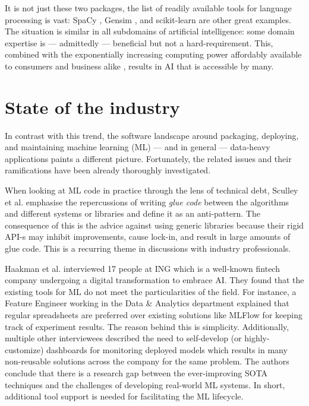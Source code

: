 It is not just these two packages, the list of readily available tools for language processing is vast: SpaCy \cite{srinivasa2018natural}, Gensim \cite{vrehuuvrek2011gensim}, and scikit-learn \cite{pedregosa2011scikit} are other great examples. The situation is similar in all subdomains of artificial intelligence: some domain expertise is --- admittedly --- beneficial but not a hard-requirement. This, combined with the exponentially increasing computing power affordably available to consumers and business alike \cite{sun2019summarizing}, results in AI that is accessible by many.

\section{State of the industry} \label{section:industry}

In contrast with this trend, the software landscape around packaging, deploying, and maintaining machine learning (ML) --- and in general --- data-heavy applications paints a different picture. Fortunately, the related issues and their ramifications have been already thoroughly investigated.

When looking at ML code in practice through the lens of technical debt, Sculley et al. \cite{sculley2015hidden} emphasise the repercussions of writing \textit{glue code} between the algorithms and different systems or libraries and define it as an anti-pattern. The consequence of this is the advice against using generic libraries because their rigid API-s may inhibit improvements, cause lock-in, and result in large amounts of glue code. This is a recurring theme in discussions with industry professionals.

Haakman et al. \cite{haakman2021ai} interviewed 17 people at ING which is a well-known fintech company undergoing a digital transformation to embrace AI. They found that the existing tools for ML do not meet the particularities of the field. For instance, a Feature Engineer working in the Data \& Analytics department explained that regular spreadsheets are preferred over existing solutions like MLFlow for keeping track of experiment results. The reason behind this is simplicity. Additionally, multiple other interviewees described the need to self-develop (or highly-customize) dashboards for monitoring deployed models which results in many non-reusable solutions across the company for the same problem. The authors conclude that there is a research gap between the ever-improving SOTA techniques and the challenges of developing real-world ML systems. In short, additional tool support is needed for facilitating the ML lifecycle.

